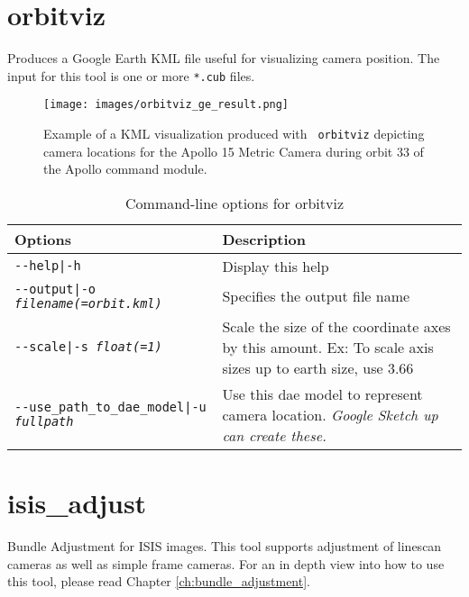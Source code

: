 \clearpage

\section{orbitviz}
\label{orbitviz}

Produces a Google Earth \ac{KML} file useful for visualizing camera
position. The input for this tool is one or more \texttt{*.cub} files.

\begin{figure}[!b]
  \begin{center}
  \texttt{[image: images/orbitviz\_ge\_result.png]}
  \end{center}
  \caption{ Example of a \ac{KML} visualization produced with {\tt
      orbitviz} depicting camera locations for the Apollo 15 Metric
    Camera during orbit 33 of the Apollo command module.}
  \label{fig:orbitviz_example}
\end{figure}

\begin{longtable}{|l|p{10cm}|}
\caption{Command-line options for orbitviz}
\label{tbl:orbitviz}
\endfirsthead
\endhead
\endfoot
\endlastfoot
\hline
Options & Description \\ \hline \hline
\texttt{-\/-help|-h} & Display this help \\ \hline
\texttt{-\/-output|-o \textit{filename(=orbit.kml)}} & Specifies the output file name \\ \hline
\texttt{-\/-scale|-s \textit{float(=1)}} & Scale the size of the coordinate axes by this amount. Ex: To scale axis sizes up to earth size, use 3.66 \\ \hline
\texttt{-\/-use\_path\_to\_dae\_model|-u \textit{fullpath}} & Use this dae model to represent camera location. \emph{Google Sketch up can create these.} \\ \hline
\end{longtable}

\clearpage


\section{isis\_adjust}

Bundle Adjustment for \ac{ISIS} images. This tool supports adjustment of
linescan cameras as well as simple frame cameras. For an in depth view
into how to use this tool, please read Chapter
\ref{ch:bundle_adjustment}.

